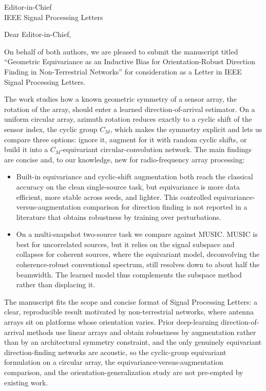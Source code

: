 \documentclass[11pt]{letter}
\begin{document}
\begin{letter}{Editor-in-Chief\\ IEEE Signal Processing Letters}

\opening{Dear Editor-in-Chief,}

On behalf of both authors, we are pleased to submit the manuscript titled
``Geometric Equivariance as an Inductive Bias for Orientation-Robust Direction
Finding in Non-Terrestrial Networks'' for consideration as a Letter in IEEE Signal
Processing Letters.

The work studies how a known geometric symmetry of a sensor array, the rotation of
the array, should enter a learned direction-of-arrival estimator. On a uniform
circular array, azimuth rotation reduces exactly to a cyclic shift of the sensor
index, the cyclic group $C_M$, which makes the symmetry explicit and lets us compare
three options: ignore it, augment for it with random cyclic shifts, or build it into
a $C_M$-equivariant circular-convolution network. The main findings are concise and,
to our knowledge, new for radio-frequency array processing:

\begin{itemize}[leftmargin=1.4em,itemsep=2pt,topsep=2pt]
\item Built-in equivariance and cyclic-shift augmentation both reach the classical
accuracy on the clean single-source task, but equivariance is more data efficient,
more stable across seeds, and lighter. This controlled equivariance-versus-augmentation
comparison for direction finding is not reported in a literature that obtains
robustness by training over perturbations.
\item On a multi-snapshot two-source task we compare against MUSIC. MUSIC is best for
uncorrelated sources, but it relies on the signal subspace and collapses for coherent
sources, where the equivariant model, deconvolving the coherence-robust conventional
spectrum, still resolves down to about half the beamwidth. The learned model thus
complements the subspace method rather than displacing it.
\end{itemize}

The manuscript fits the scope and concise format of Signal Processing Letters: a
clear, reproducible result motivated by non-terrestrial networks, where antenna
arrays sit on platforms whose orientation varies. Prior deep-learning
direction-of-arrival methods use linear arrays and obtain robustness by augmentation
rather than by an architectural symmetry constraint, and the only genuinely
equivariant direction-finding networks are acoustic, so the cyclic-group equivariant
formulation on a circular array, the equivariance-versus-augmentation comparison, and
the orientation-generalization study are not pre-empted by existing work.


\end{letter}
\end{document}

